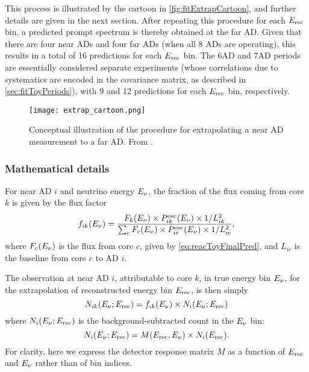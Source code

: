 \documentclass[../thesis.tex]{subfiles}
\begin{document}
This process is illustrated by the cartoon in \autoref{fig:fitExtrapCartoon}, and further details are given in the next section. After repeating this procedure for each $E_\mathrm{rec}$ bin, a predicted prompt spectrum is thereby obtained at the far AD. Given that there are four near ADs and four far ADs (when all 8 ADs are operating), this results in a total of 16 predictions for each $E_\mathrm{rec}$ bin. The 6AD and 7AD periods are essentially considered separate experiments (whose correlations due to systematics are encoded in the covariance matrix, as described in \autoref{sec:fitToyPeriods}), with 9 and 12 predictions for each $E_\mathrm{rec}$ bin, respectively.

\begin{figure}[ht]
  \centering
  \texttt{[image: extrap\_cartoon.png]}
  \caption{Conceptual illustration of the procedure for extrapolating a near AD measurement to a far AD. From \cite{berkeley_shapefit}.}
  \label{fig:fitExtrapCartoon} 
\end{figure}

\subsubsection{Mathematical details}

For near AD $i$ and neutrino energy $E_\mathrm{\nu}$, the fraction of the flux coming from core $k$ is given by the flux factor
\begin{equation}
  \label{eq:fitFluxFactor}
  f_{ik}(E_\mathrm{\nu}) = \frac{F_k(E_\mathrm{\nu}) \times P^{\mathrm{osc}}_{ik}(E_\mathrm{\nu}) \times 1/L^2_{ik}}
  {\sum_c F_c(E_\mathrm{\nu}) \times P^{\mathrm{osc}}_{ic}(E_\mathrm{\nu}) \times 1/L^2_{ic}},
\end{equation}
where $F_c(E_\mathrm{\nu})$ is the flux from core $c$, given by \autoref{eq:reacToyFinalPred}, and $L_{ic}$ is the baseline from core $c$ to AD $i$.

The observation at near AD $i$, attributable to core $k$, in true energy bin $E_\mathrm{\nu}$, for the extrapolation of reconstructed energy bin $E_\mathrm{rec}$, is then simply
\begin{equation*}
  N_{ik}(E_\mathrm{\nu}; E_\mathrm{rec}) = f_{ik}(E_\mathrm{\nu}) \times N_i(E_\mathrm{\nu}; E_\mathrm{rec})
\end{equation*}
where $N_i(E_\mathrm{\nu}; E_\mathrm{rec})$ is the background-subtracted count in the $E_\mathrm{\nu}$ bin:
\begin{equation*}
  N_i(E_\mathrm{\nu}; E_\mathrm{rec}) = M(E_\mathrm{rec}, E_\mathrm{\nu}) \times N_i(E_\mathrm{rec}).
\end{equation*}
For clarity, here we express the detector response matrix $M$ as a function of $E_\mathrm{rec}$ and $E_\mathrm{\nu}$ rather than of bin indices.
\end{document}
